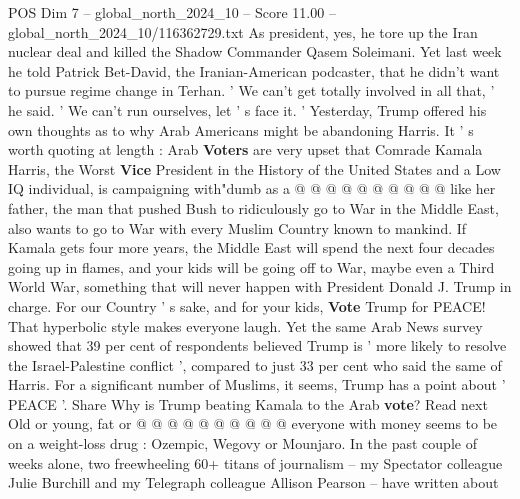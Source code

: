 \begin{textsample}{POS Dim 7 – global\_north\_2024\_10 – Score 11.00 – global\_north\_2024\_10/116362729.txt}
As president, yes, he tore up the Iran nuclear deal and killed the Shadow Commander Qasem Soleimani.
Yet last week he told Patrick Bet-David, the Iranian-American podcaster, that he didn't want to pursue regime change in Terhan. ' We can't get totally involved in all that, ' he said. ' We can't run ourselves, let ' s face it. ' Yesterday, Trump offered his own thoughts as to why Arab Americans might be abandoning Harris.
It ' s worth quoting at length : Arab \textbf{Voters} are very upset that Comrade Kamala Harris, the Worst \textbf{Vice} President in the History of the United States and a Low IQ individual, is campaigning with"dumb as a @ @ @ @ @ @ @ @ @ @ like her father, the man that pushed Bush to ridiculously go to War in the Middle East, also wants to go to War with every Muslim Country known to mankind.
If Kamala gets four more years, the Middle East will spend the next four decades going up in flames, and your kids will be going off to War, maybe even a Third World War, something that will never happen with President Donald J.
Trump in charge.
For our Country ' s sake, and for your kids, \textbf{Vote} Trump for PEACE!
That hyperbolic style makes everyone laugh.
Yet the same Arab News survey showed that 39 per cent of respondents believed Trump is ' more likely to resolve the Israel-Palestine conflict ', compared to just 33 per cent who said the same of Harris.
For a significant number of Muslims, it seems, Trump has a point about ' PEACE '.
Share Why is Trump beating Kamala to the Arab \textbf{vote}?
Read next Old or young, fat or @ @ @ @ @ @ @ @ @ @ everyone with money seems to be on a weight-loss drug : Ozempic, Wegovy or Mounjaro.
In the past couple of weeks alone, two freewheeling 60+ titans of journalism -- my Spectator colleague Julie Burchill and my Telegraph colleague Allison Pearson -- have written about

\end{textsample}
